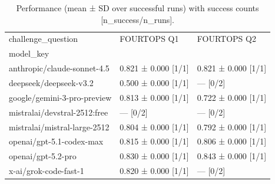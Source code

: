 \begin{table}
\caption{Performance (mean ± SD over successful runs) with success counts [n\_success/n\_runs].}
\label{tab:benchmark_performance}
\begin{tabular}{lll}
\toprule
challenge_question & FOURTOPS Q1 & FOURTOPS Q2 \\
model_key &  &  \\
\midrule
anthropic/claude-sonnet-4.5 & 0.821 ± 0.000 [1/1] & 0.821 ± 0.000 [1/1] \\
deepseek/deepseek-v3.2 & 0.500 ± 0.000 [1/1] & — [0/2] \\
google/gemini-3-pro-preview & 0.813 ± 0.000 [1/1] & 0.722 ± 0.000 [1/1] \\
mistralai/devstral-2512:free & — [0/2] & — [0/2] \\
mistralai/mistral-large-2512 & 0.804 ± 0.000 [1/1] & 0.792 ± 0.000 [1/1] \\
openai/gpt-5.1-codex-max & 0.815 ± 0.000 [1/1] & 0.806 ± 0.000 [1/1] \\
openai/gpt-5.2-pro & 0.830 ± 0.000 [1/1] & 0.843 ± 0.000 [1/1] \\
x-ai/grok-code-fast-1 & 0.820 ± 0.000 [1/1] & — [0/2] \\
\bottomrule
\end{tabular}
\end{table}
